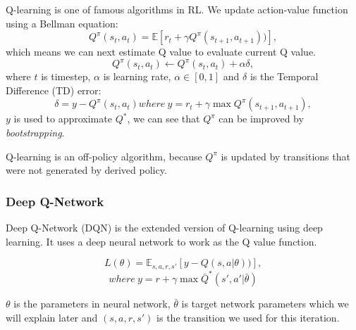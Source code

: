 \documentclass[11pt,twocolumn]{jarticle} %
\begin{document}
Q-learning is one of famous algorithms in RL. We update action-value function using a Bellman equation: 
\begin{equation}
Q^\pi(s_t, a_t) = \mathbb{E}[r_{t} + \gamma Q^\pi(s_{t+1}, a_{t+1}))],  
\end{equation}
which means we can next estimate Q value to evaluate current Q value.
\begin{equation}
Q^\pi(s_t, a_t) \leftarrow Q^\pi(s_t, a_t) + \alpha\delta,
\end{equation}
where $t$ is timestep, $\alpha$ is learning rate, $\alpha \in [0, 1]$ and $\delta$ is the Temporal Difference (TD) error:
\begin{equation}
\delta = y - Q^\pi(s_t, a_t)
where \ y = r_t + \gamma\max Q^\pi(s_{t+1}, a_{t+1}),
\end{equation}
$y$ is used to approximate $Q^*$, we can see that $Q^\pi$ can be improved by \textsl{bootstrapping}.\par 
Q-learning is an off-policy algorithm, because $Q^\pi$ is updated by transitions that were not generated by derived policy.

\subsubsection{Deep Q-Network\cite{dqn}}

Deep Q-Network (DQN) is the extended version of Q-learning using deep learning. It uses a deep neural network to work as the Q value function. 

\begin{equation} \label{eq:dqn-loss}
L(\theta) = \mathbb{E}_{s,a,r,s'}[y - Q(s, a|\theta))],  
\end{equation}
$$where \ y = r + \gamma\max \bar{Q}^*(s', a'|\bar{\theta})$$

$\theta$ is the parameters in neural network, $\bar{\theta}$ is target network parameters which we will explain later and $(s,a,r,s')$ is the transition we used for this iteration. \par
\end{document}
